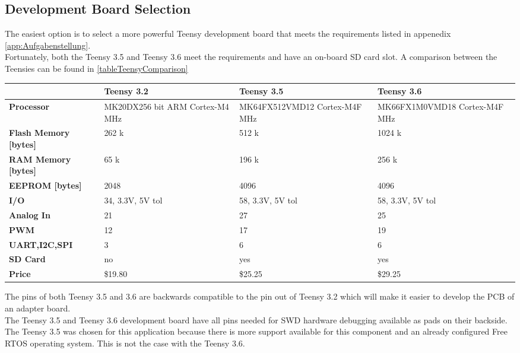 \subsection{Development Board Selection} \label{subsec:txtTeensySelection}
The easiest option is to select a more powerful Teensy development board that meets the requirements listed in appenedix \autoref{app:Aufgabenstellung}.\\
Fortunately, both the Teensy 3.5 and Teensy 3.6 meet the requirements and have an on-board SD card slot. A comparison between the Teensies can be found in \autoref{tableTeensyComparison}
%
\begin{table}[h]
    \begin{center}
        \begin{tabular}{l|L{4cm}L{4cm}L{4cm}}
             & \textbf{Teensy 3.2} & \textbf{Teensy 3.5} & \textbf{Teensy 3.6} \\
             \hline
            \textbf{Processor} & MK20DX256  bit ARM \newline Cortex-M4  MHz & 
            MK64FX512VMD12 \newline Cortex-M4F  MHz & 
            MK66FX1M0VMD18 \newline Cortex-M4F  MHz \\
            \textbf{Flash Memory [bytes]} & 262 k & 512 k & 1024 k \\
            \textbf{RAM Memory [bytes]} & 65 k & 196 k & 256 k \\
            \textbf{EEPROM [bytes]}	 & 2048 & 4096 & 4096 \\
            \textbf{I/O} & 34, 3.3V, 5V tol & 58, 3.3V, 5V tol & 58, 3.3V, 5V tol \\
            \textbf{Analog In} & 21 & 27 & 25 \\
            \textbf{PWM} & 12 & 17 & 19 \\
            \textbf{UART,I2C,SPI} & 3 & 6 & 6 \\
            \textbf{SD Card} & no & yes & yes \\
            \textbf{Price} & \$19.80 & \$25.25 & \$29.25 \\
        \end{tabular}
    \end{center}
    \label{tableTeensyComparison}
\end{table}
%
The pins of both Teensy 3.5 and 3.6 are backwards compatible to the pin out of Teensy 3.2 which will make it easier to develop the PCB of an adapter board. \\
The Teensy 3.5 and Teensy 3.6 development board have all pins needed for SWD hardware debugging available as pads on their backside. \\
The Teensy 3.5 was chosen for this application because there is more support available for this component and an already configured Free RTOS operating system. This is not the case with the Teensy 3.6.\\
%
%
